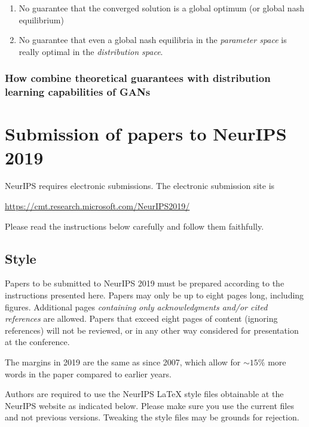 \documentclass{article}
\begin{document}
\begin{enumerate}
\def\labelenumi{\arabic{enumi}.}
\item
  No guarantee that the converged solution is a global optimum (or
  global nash equilibrium)
\item
  No guarantee that even a global nash equilibria in the \emph{parameter
  space} is really optimal in the \emph{distribution space}. 
\end{enumerate}

\hypertarget{header-n24}{%
\subsubsection{How combine theoretical guarantees with distribution
learning capabilities of GANs}\label{header-n24}}

\section{Submission of papers to NeurIPS 2019}

NeurIPS requires electronic submissions.  The electronic submission site is
\begin{center}
  \url{https://cmt.research.microsoft.com/NeurIPS2019/}
\end{center}

Please read the instructions below carefully and follow them faithfully.

\subsection{Style}

Papers to be submitted to NeurIPS 2019 must be prepared according to the
instructions presented here. Papers may only be up to eight pages long,
including figures. Additional pages \emph{containing only acknowledgments and/or
  cited references} are allowed. Papers that exceed eight pages of content
(ignoring references) will not be reviewed, or in any other way considered for
presentation at the conference.

The margins in 2019 are the same as since 2007, which allow for $\sim$$15\%$
more words in the paper compared to earlier years.

Authors are required to use the NeurIPS \LaTeX{} style files obtainable at the
NeurIPS website as indicated below. Please make sure you use the current files
and not previous versions. Tweaking the style files may be grounds for
rejection.
\end{document}
